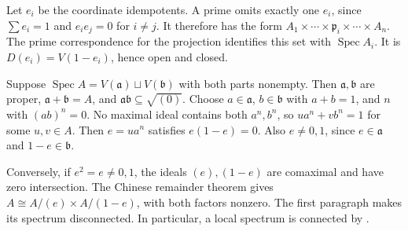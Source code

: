 Let $e_i$ be the coordinate idempotents. A prime omits exactly one $e_i$, since $\sum e_i=1$ and $e_ie_j=0$ for $i\ne j$. It therefore has the form $A_1\times\cdots\times\mathfrak p_i\times\cdots\times A_n$. The prime correspondence for the projection identifies this set with $\operatorname{Spec}A_i$. It is $D(e_i)=V(1-e_i)$, hence open and closed.

Suppose $\operatorname{Spec}A=V(\mathfrak a)\sqcup V(\mathfrak b)$ with both parts nonempty. Then $\mathfrak a,\mathfrak b$ are proper, $\mathfrak a+\mathfrak b=A$, and $\mathfrak a\mathfrak b\subseteq\sqrt{(0)}$. Choose $a\in\mathfrak a$, $b\in\mathfrak b$ with $a+b=1$, and $n$ with $(ab)^n=0$. No maximal ideal contains both $a^n,b^n$, so $ua^n+vb^n=1$ for some $u,v\in A$. Then $e=ua^n$ satisfies $e(1-e)=0$. Also $e\ne0,1$, since $e\in\mathfrak a$ and $1-e\in\mathfrak b$.

Conversely, if $e^2=e\ne0,1$, the ideals $(e),(1-e)$ are comaximal and have zero intersection. The Chinese remainder theorem gives $A\cong A/(e)\times A/(1-e)$, with both factors nonzero. The first paragraph makes its spectrum disconnected. In particular, a local spectrum is connected by .

